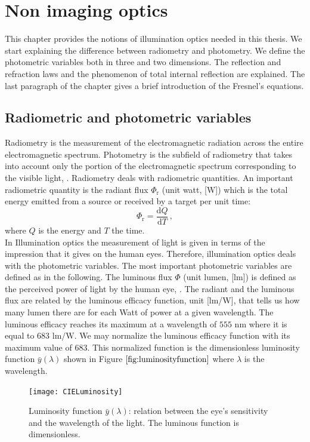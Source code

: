 \chapter{Non imaging optics}
This chapter provides the notions of illumination optics needed in this thesis. We start explaining the difference between radiometry and photometry.
We define the photometric variables  both in three and two dimensions. The reflection and refraction laws and the phenomenon of total internal reflection are explained. The last paragraph of the chapter gives a brief introduction of the Fresnel's equations. 
\section{Radiometric and photometric variables}
Radiometry is the measurement of the electromagnetic radiation across the entire electromagnetic spectrum. Photometry is the subfield of radiometry that takes into account only the portion of the electromagnetic spectrum corresponding to the visible light, \cite{zalewski1995radiometry}. Radiometry deals with radiometric quantities. An important radiometric quantity  is the radiant flux $\Phi_{\textrm{r}}$ (unit watt, [\textrm{W}]) which is the total energy emitted from a source or received by a target per unit time:
\begin{equation}
\Phi_{\textrm{r}} = \frac{\textrm{d}Q}{\textrm{d}T}\,,
\end{equation}
where $Q$ is the energy and $T$ the time.\\
\indent In Illumination optics the measurement of light is given in terms of the impression that it gives on the human eyes. Therefore, illumination optics deals with the photometric variables. The most important photometric variables are defined as in the following. The luminous flux $\Phi$ (unit lumen, [\textrm{lm}]) is defined as the perceived power of light by the human eye, \cite{chaves2015introduction}.
 The radiant and the luminous flux are related by the luminous efficacy function, unit [lm/W], that tells us how many lumen there are for each Watt of power at a given wavelength.
 The luminous efficacy reaches its maximum  at a wavelength of $555$ $\textrm{nm}$ where it is equal to $683$ $\textrm{lm}/\textrm{W}$.
  We may normalize the luminous efficacy function with its maximum value of $683$.
  This normalized function is the dimensionless luminosity function $\bar{y}(\lambda)$ shown in Figure $\ref{fig:luminosityfunction}$ where $\lambda$ is the wavelength.
\begin{figure}[h]
  \begin{center}
  \texttt{[image: CIELuminosity]}
  \end{center}
  \caption{Luminosity function $\bar{y}(\lambda)$: relation between the eye's sensitivity and the wavelength of the light. The luminous function is dimensionless.}
  \label{fig:luminosityfunction}
  \end{figure}

